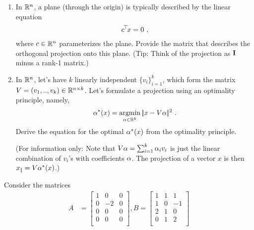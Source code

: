 

\renewcommand{\course}{Maths for Intelligent Systems}
\renewcommand{\coursedate}{Summer 2019}

\renewcommand{\exnum}{Exercise 2}

\exercises


\exercisestitle



\begin{enumerate}

  \item
In ${\mathbb{R}}^n$, a plane (through the origin) is typically described by
the linear equation
\begin{align}
  c^{\!\top\!} x = 0 ~,
\end{align}
where $c\in{\mathbb{R}}^n$ parameterizes the plane. Provide the matrix that describes the orthogonal projection onto this plane. (Tip: Think of the projection as ${\rm\bf I}$ minus a rank-1 matrix.)


\item In ${\mathbb{R}}^n$, let's have $k$ linearly independent $\{v_i\}_{i=1}^k$, which form the matrix $V = (v_1,..,v_k) \in{\mathbb{R}}^{n\times k}$. Let's formulate a projection using an optimality principle, namely,
\begin{align}
  \alpha^*(x) = \operatorname*{argmin}_{\alpha\in{\mathbb{R}}^k} |\!|x - V \alpha|\!|^2 ~.
\end{align}
Derive the equation for the optimal $\alpha^*(x)$ from the optimality principle.

(For information only: Note that $V \alpha = \sum_{i=1}^k \alpha_i v_i$ is just the linear combination of $v_i$'s with coefficients $\alpha$. The projection of a vector $x$ is then $x_{|\!|} = V \alpha^*(x)$.)


\end{enumerate}



Consider the matrices
\begin{align}
  A &= \begin{bmatrix}
      1 & 0 & 0 \\
      0 & -2 & 0 \\
      0 & 0 & 0 \\
      0 & 0 & 0 \\
  \end{bmatrix} \comma
  B = \begin{bmatrix}
      1 & 1 & 1 \\
      1 & 0 & -1 \\
      2 & 1 & 0 \\
      0 & 1 & 2 \\
  \end{bmatrix}
\end{align}

